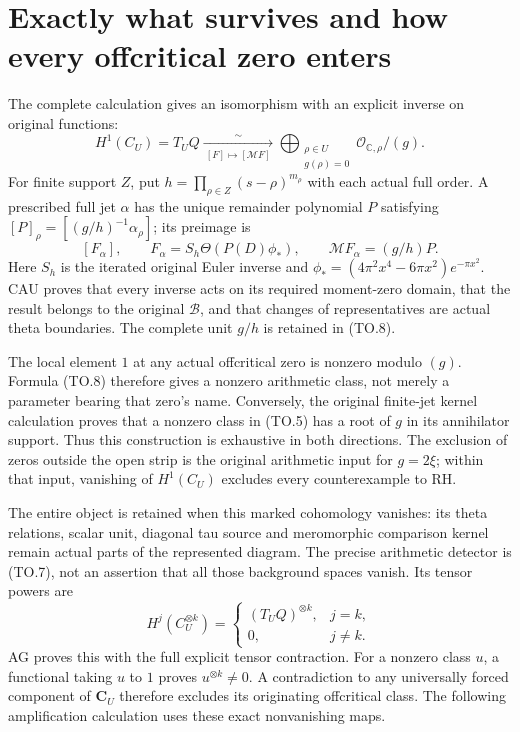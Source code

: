 \section{Exactly what survives and how every offcritical zero enters}

The complete calculation gives an isomorphism with an explicit
inverse on original functions:
\[
 H^1(C_U)=T_UQ\xrightarrow[\ [F]\mapsto[\mathcal MF]\ ]{\sim}
 \bigoplus_{\substack{\rho\in U\\g(\rho)=0}}
               \mathcal O_{\mathbb C,\rho}/(g).
 \tag{TO.7}
\]
For finite support $Z$, put $h=\prod_{\rho\in Z}(s-\rho)^{m_\rho}$
with each actual full order.  A prescribed full jet $\alpha$ has
the unique remainder polynomial $P$ satisfying
$[P]_\rho=[(g/h)^{-1}\alpha_\rho]$; its preimage is
\[
 [F_\alpha],\qquad
 F_\alpha=S_h\Theta(P(D)\phi_*),\qquad
 \mathcal MF_\alpha=(g/h)P.                                 \tag{TO.8}
\]
Here $S_h$ is the iterated original Euler inverse and
$\phi_*=(4\pi^2x^4-6\pi x^2)e^{-\pi x^2}$.
CAU proves that every inverse acts on its required moment-zero
domain, that the result belongs to the original $\mathscr B$,
and that changes of representatives are actual theta boundaries.
The complete unit $g/h$ is retained in (TO.8).

The local element $1$ at any actual offcritical zero is nonzero
modulo $(g)$.  Formula (TO.8) therefore gives a nonzero arithmetic
class, not merely a parameter bearing that zero's name.  Conversely,
the original finite-jet kernel calculation proves that a nonzero
class in (TO.5) has a root of $g$ in its annihilator support.
Thus this construction is exhaustive in both directions.
The exclusion of zeros outside the open strip is the original
arithmetic input for $g=2\xi$; within that input, vanishing of
$H^1(C_U)$ excludes every counterexample to RH.

The entire object is retained when this marked cohomology vanishes:
its theta relations, scalar unit, diagonal tau source and meromorphic
comparison kernel remain actual parts of the represented diagram.
The precise arithmetic detector is (TO.7), not an assertion that
all those background spaces vanish.  Its tensor powers are
\[
 H^j(C_U^{\otimes k})=
 \begin{cases}(T_UQ)^{\otimes k},&j=k,\\0,&j\ne k.
 \end{cases}                                                \tag{TO.9}
\]
AG proves this with the full explicit tensor contraction.  For a
nonzero class $u$, a functional taking $u$ to $1$ proves
$u^{\otimes k}\ne0$.  A contradiction to any universally forced
component of $\mathbf C_U$ therefore excludes its originating
offcritical class.  The following amplification calculation uses
these exact nonvanishing maps.


